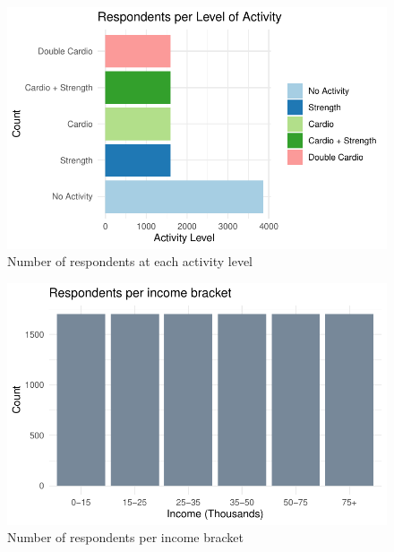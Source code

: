 \documentclass[
  letterpaper,
  DIV=11,
  numbers=noendperiod]{scrartcl}
\begin{document}
\begin{figure}

{\centering \includegraphics[width=\textwidth,height=0.2\textheight]{paper_files/figure-pdf/fig-activity-1.pdf}

}

\caption{\label{fig-activity}Number of respondents at each activity
level}

\end{figure}

\begin{figure}

{\centering \includegraphics[width=\textwidth,height=0.2\textheight]{paper_files/figure-pdf/fig-income-1.pdf}

}

\caption{\label{fig-income}Number of respondents per income bracket}

\end{figure}
\end{document}

